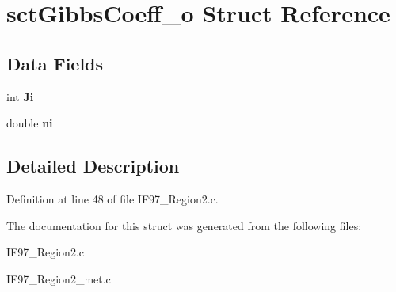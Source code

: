 \hypertarget{structsctGibbsCoeff__o}{\section{sct\-Gibbs\-Coeff\-\_\-o Struct Reference}
\label{structsctGibbsCoeff__o}
}
\subsection*{Data Fields}
\begin{DoxyCompactItemize}
\item 
\hypertarget{structsctGibbsCoeff__o_aab5e228486391d355e467303c0a0b279}{int {\bfseries Ji}}\label{structsctGibbsCoeff__o_aab5e228486391d355e467303c0a0b279}

\item 
\hypertarget{structsctGibbsCoeff__o_a1892b58175b86f0fc83321e54a7d661f}{double {\bfseries ni}}\label{structsctGibbsCoeff__o_a1892b58175b86f0fc83321e54a7d661f}

\end{DoxyCompactItemize}


\subsection{Detailed Description}


Definition at line 48 of file I\-F97\-\_\-\-Region2.\-c.



The documentation for this struct was generated from the following files\-:\begin{DoxyCompactItemize}
\item 
I\-F97\-\_\-\-Region2.\-c\item 
I\-F97\-\_\-\-Region2\-\_\-met.\-c\end{DoxyCompactItemize}
